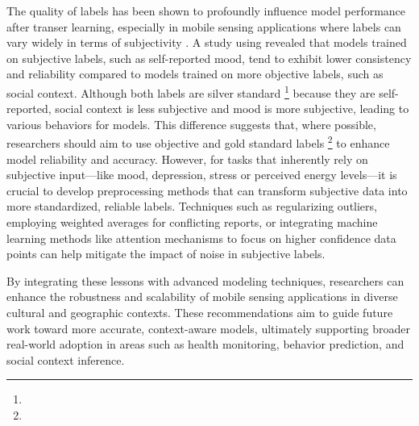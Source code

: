 The quality of labels has been shown to profoundly influence model performance after transer learning, especially in mobile sensing applications where labels can vary widely in terms of subjectivity \cite{zeni2019fixing,bontempelli2020learning,wu2023udama}. A study using \dataset \cite{meegahapola2024m3bat} revealed that models trained on subjective labels, such as self-reported mood, tend to exhibit lower consistency and reliability compared to models trained on more objective labels, such as social context. Although both labels are silver standard \footnote{} because they are self-reported, social context is less subjective and mood is more subjective, leading to various behaviors for models. This difference suggests that, where possible, researchers should aim to use objective and gold standard labels \footnote{} to enhance model reliability and accuracy. However, for tasks that inherently rely on subjective input—like mood, depression, stress or perceived energy levels---it is crucial to develop preprocessing methods that can transform subjective data into more standardized, reliable labels. Techniques such as regularizing outliers, employing weighted averages for conflicting reports, or integrating machine learning methods like attention mechanisms to focus on higher confidence data points can help mitigate the impact of noise in subjective labels.

By integrating these lessons with advanced modeling techniques, researchers can enhance the robustness and scalability of mobile sensing applications in diverse cultural and geographic contexts. These recommendations aim to guide future work toward more accurate, context-aware models, ultimately supporting broader real-world adoption in areas such as health monitoring, behavior prediction, and social context inference.




